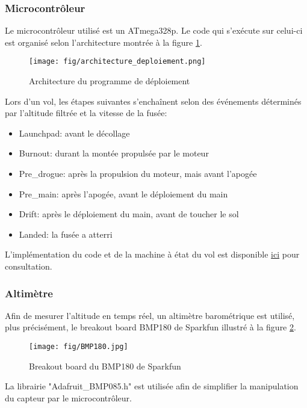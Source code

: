 \subsubsection{Microcontrôleur}

Le microcontrôleur utilisé est un ATmega328p. Le code qui s'exécute sur celui-ci
est organisé selon l'architecture montrée à la figure \ref{f:arch_deploiement}.

\begin{figure}[H]
	\center
	\texttt{[image: fig/architecture\_deploiement.png]}
	\caption{Architecture du programme de déploiement}
	\label{f:arch_deploiement}
\end{figure}

Lors d'un vol, les étapes suivantes s'enchaînent selon des événements déterminés
par l'altitude filtrée et la vitesse de la fusée:

\begin{itemize}
	\item Launchpad: avant le décollage
	\item Burnout: durant la montée propulsée par le moteur
	\item Pre\_drogue: après la propulsion du moteur, mais avant l'apogée
	\item Pre\_main: après l'apogée, avant le déploiement du main
	\item Drift: après le déploiement du main, avant de toucher le sol
	\item Landed: la fusée a atterri
\end{itemize}


L'implémentation du code et de la machine à état du vol est disponible
\href{https://github.com/ul-gaul/deploiement}{ici} pour consultation.

\subsubsection{Altimètre}

Afin de mesurer l'altitude en temps réel, un altimètre barométrique est
utilisé, plus précisément, le breakout board BMP180 de Sparkfun illustré à la
figure \ref{f:BMP180}.

\begin{figure}[H]
	\center
	\texttt{[image: fig/BMP180.jpg]}
	\caption{Breakout board du BMP180 de Sparkfun}
	\label{f:BMP180}
\end{figure}

La librairie "Adafruit\_BMP085.h" est utilisée afin de simplifier la
manipulation du capteur par le microcontrôleur.

